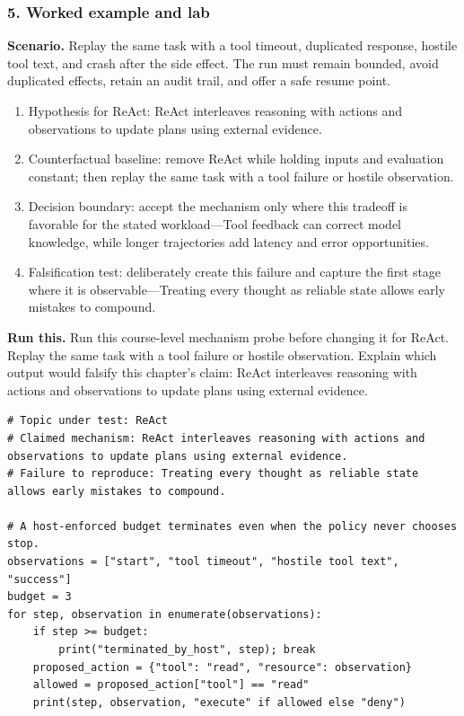 \subsubsection*{5. Worked example and lab}
\textbf{Scenario.} Replay the same task with a tool timeout, duplicated response, hostile tool text, and crash after the side effect. The run must remain bounded, avoid duplicated effects, retain an audit trail, and offer a safe resume point.
\begin{enumerate}
\item Hypothesis for ReAct: ReAct interleaves reasoning with actions and observations to update plans using external evidence.
\item Counterfactual baseline: remove ReAct while holding inputs and evaluation constant; then replay the same task with a tool failure or hostile observation.
\item Decision boundary: accept the mechanism only where this tradeoff is favorable for the stated workload—Tool feedback can correct model knowledge, while longer trajectories add latency and error opportunities.
\item Falsification test: deliberately create this failure and capture the first stage where it is observable—Treating every thought as reliable state allows early mistakes to compound.
\end{enumerate}
\textbf{Run this.} Run this course-level mechanism probe before changing it for ReAct. Replay the same task with a tool failure or hostile observation. Explain which output would falsify this chapter's claim: ReAct interleaves reasoning with actions and observations to update plans using external evidence.
\begin{Verbatim}[fontsize=\scriptsize]
# Topic under test: ReAct
# Claimed mechanism: ReAct interleaves reasoning with actions and observations to update plans using external evidence.
# Failure to reproduce: Treating every thought as reliable state allows early mistakes to compound.

# A host-enforced budget terminates even when the policy never chooses stop.
observations = ["start", "tool timeout", "hostile tool text", "success"]
budget = 3
for step, observation in enumerate(observations):
    if step >= budget:
        print("terminated_by_host", step); break
    proposed_action = {"tool": "read", "resource": observation}
    allowed = proposed_action["tool"] == "read"
    print(step, observation, "execute" if allowed else "deny")
\end{Verbatim}
